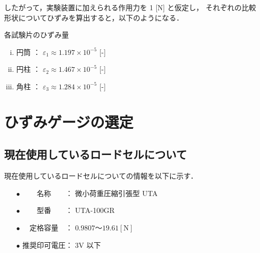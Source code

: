 \documentclass[twocolumn,a4j]{jsarticle}
\begin{document}
したがって，実験装置に加えられる作用力を 1 [N] と仮定し，
それぞれの比較形状についてひずみを算出すると，以下のようになる．

\begin{itembox}[l]{各試験片のひずみ量}
    \begin{enumerate}[(i)]
        \item 円筒 ： $\varepsilon_1 \approx 1.197 × 10^{-5}$ [-]
        \item 円柱 ： $\varepsilon_2 \approx 1.467 × 10^{-5}$ [-]
        \item 角柱 ： $\varepsilon_3 \approx 1.284 × 10^{-5}$ [-]
    \end{enumerate}
\end{itembox}

\newpage

\section{ひずみゲージの選定}

\subsection{現在使用しているロードセルについて}
現在使用しているロードセルについての情報を以下に示す．

\begin{screen}
    \begin{itemize}
        \item [$\bullet$] 　　名称　　： 微小荷重圧縮引張型 UTA
        \item [$\bullet$] 　　型番　　： UTA-100GR
        \item [$\bullet$] 　定格容量　： $0.9807 ～ 19.61 \left[\mathrm{N}\right]$
        \item [$\bullet$] 推奨印可電圧： 3V 以下
    \end{itemize}
\end{screen}
\end{document}
